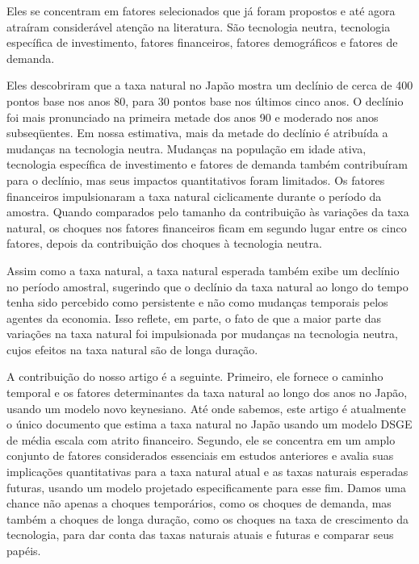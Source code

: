 Eles se concentram em fatores selecionados que já foram propostos e até agora atraíram considerável atenção na literatura. São tecnologia neutra, tecnologia específica de investimento, fatores financeiros, fatores demográficos e fatores de demanda.

Eles descobriram que a taxa natural no Japão mostra um declínio de cerca de 400 pontos base nos anos 80, para 30 pontos base nos últimos cinco anos. O declínio foi mais pronunciado na primeira metade dos anos 90 e moderado nos anos subseqüentes. Em nossa estimativa, mais da metade do declínio é atribuída a mudanças na tecnologia neutra. Mudanças na população em idade ativa, tecnologia específica de investimento e fatores de demanda também contribuíram para o declínio, mas seus impactos quantitativos foram limitados. Os fatores financeiros impulsionaram a taxa natural ciclicamente durante o período da amostra. Quando comparados pelo tamanho da contribuição às variações da taxa natural, os choques nos fatores financeiros ficam em segundo lugar entre os cinco fatores, depois da contribuição dos choques à tecnologia neutra.

Assim como a taxa natural, a taxa natural esperada também exibe um declínio no período amostral, sugerindo que o declínio da taxa natural ao longo do tempo tenha sido percebido como persistente e não como mudanças temporais pelos agentes da economia. Isso reflete, em parte, o fato de que a maior parte das variações na taxa natural foi impulsionada por mudanças na tecnologia neutra, cujos efeitos na taxa natural são de longa duração.

A contribuição do nosso artigo é a seguinte. Primeiro, ele fornece o caminho temporal e os fatores determinantes da taxa natural ao longo dos anos no Japão, usando um modelo novo keynesiano. Até onde sabemos, este artigo é atualmente o único documento que estima a taxa natural no Japão usando um modelo DSGE de média escala com atrito financeiro. Segundo, ele se concentra em um amplo conjunto de fatores considerados essenciais em estudos anteriores e avalia suas implicações quantitativas para a taxa natural atual e as taxas naturais esperadas futuras, usando um modelo
projetado especificamente para esse fim. Damos uma chance não apenas a choques temporários, como os choques de demanda, mas também a choques de longa duração, como os choques na taxa de crescimento da tecnologia, para dar conta das taxas naturais atuais e futuras e comparar seus papéis.

